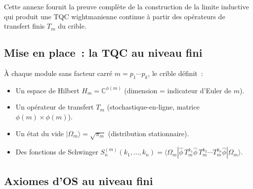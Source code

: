 \documentclass[12pt,a4paper]{article}
\begin{document}
Cette annexe fournit la preuve complète de la construction de la
limite inductive qui produit une TQC wightmanienne continue à
partir des opérateurs de transfert finis $T_m$ du crible.

\subsection{Mise en place~: la TQC au niveau fini}
\label{sec:os_setup}

À chaque module sans facteur carré $m = p_1 \cdots p_k$, le crible
définit~:
\begin{itemize}[nosep]
\item Un espace de Hilbert $H_m = \mathbb{C}^{\phi(m)}$
  (dimension = indicateur d'Euler de $m$).
\item Un opérateur de transfert $T_m$ (stochastique-en-ligne,
  matrice $\phi(m) \times \phi(m)$).
\item Un état du vide $|\Omega_m\rangle = \sqrt{\pi_m}$
  (distribution stationnaire).
\item Des fonctions de Schwinger
  $S_n^{(m)}(k_1, \ldots, k_n) =
  \langle\Omega_m| \hat\phi\, T_m^{k_1} \hat\phi\, T_m^{k_2}
  \cdots T_m^{k_n} \hat\phi |\Omega_m\rangle$.
\end{itemize}

\subsection{Axiomes d'OS au niveau fini}
\label{sec:os_finite}
\end{document}
